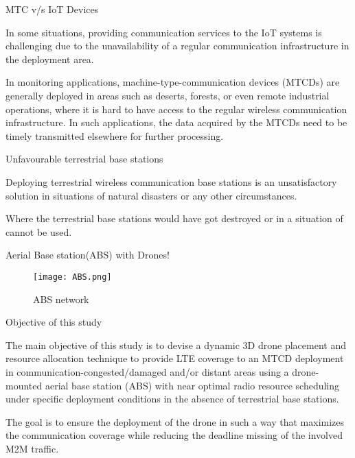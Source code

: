 \documentclass{beamer}
\begin{document}
\begin{frame}{MTC v/s IoT Devices}
\begin{block}{}
In some situations, providing communication services to the IoT systems is challenging due to the unavailability of a regular communication infrastructure in the deployment area.
\end{block}
\begin{block}{}
In monitoring applications, machine-type-communication devices (MTCDs) are generally deployed in areas such as deserts, forests, or even remote industrial operations, where it is hard to have access to the regular wireless communication infrastructure. In such applications, the data acquired by the MTCDs need to be timely transmitted elsewhere for further processing.
\end{block}
\end{frame}
\begin{frame}{Unfavourable terrestrial base stations}
\begin{block}{}
Deploying terrestrial wireless communication base stations is an unsatisfactory solution in situations of natural disasters or any other circumstances.
\end{block}
\begin{block}{}
Where the terrestrial base stations would have got destroyed or in a situation of cannot be used.
\end{block}
\end{frame}
\begin{frame}{}
   \LARGE{Aerial Base station(ABS) with Drones!}
   \begin{figure}[h!]
    \centering
    \texttt{[image: ABS.png]}
    \caption{ABS network}
    \label{fig:ABS}
   \end{figure}
\end{frame}
\begin{frame}{Objective of this study}
    \begin{block}{}
    The main objective of this study is to devise a dynamic 3D drone placement and resource allocation technique to provide LTE coverage to an MTCD deployment in communication-congested/damaged and/or distant areas using a drone-mounted aerial base station (ABS) with near optimal radio resource scheduling under specific deployment conditions in the absence of terrestrial base stations.
    \end{block}
    \begin{block}{}
    The goal is to ensure the deployment of the drone in such a way that maximizes the communication coverage while reducing the deadline missing of the involved M2M traffic.
    \end{block}
\end{frame}
\end{document}
